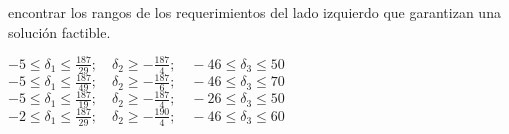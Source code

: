 \documentclass[../main.tex]{subfiles}
\begin{document}
\begin{questions}
encontrar los rangos de los requerimientos del lado izquierdo que garantizan una solución factible.

\begin{checkboxes}
  \correctchoice  $ -5 \leq \delta_1 \leq \frac{187}{29};\quad \delta_2 \geq -\frac{187}{4};\quad -46 \leq \delta_3 \leq 50 $
  \choice $-5 \leq \delta_1 \leq \frac{187}{49};\quad  \delta_2 \geq -\frac{187}{6};\quad -46 \leq \delta_3 \leq 70 $
  \choice $-5 \leq \delta_1 \leq \frac{187}{19};\quad  \delta_2 \geq -\frac{187}{4};\quad -26 \leq \delta_3 \leq 50 $
  \choice $-2 \leq \delta_1 \leq \frac{187}{29};\quad  \delta_2 \geq -\frac{190}{4};\quad -46 \leq \delta_3 \leq 60 $
\end{checkboxes}


\end{questions}
\end{document}
